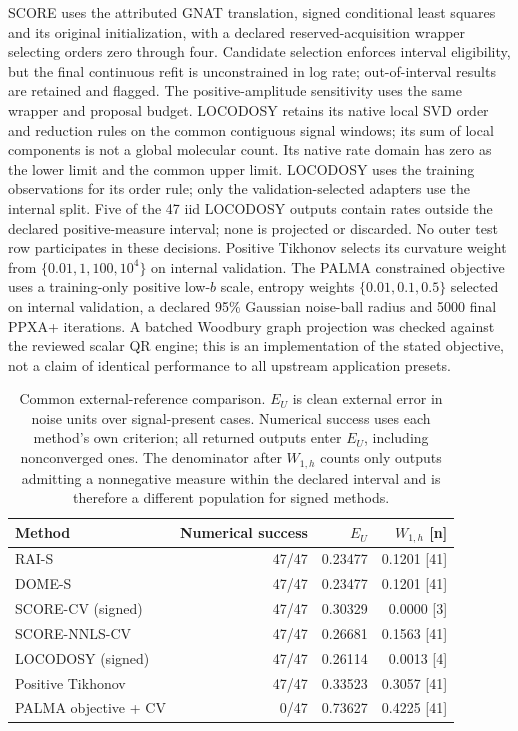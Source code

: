 SCORE uses the attributed GNAT translation, signed conditional least squares
and its original initialization, with a declared reserved-acquisition wrapper
selecting orders zero through four. Candidate selection enforces interval
eligibility, but the final continuous refit is unconstrained in log rate;
out-of-interval results are retained and flagged. The positive-amplitude
sensitivity uses the same wrapper and proposal budget. LOCODOSY retains its native local SVD
order and reduction rules on the common contiguous signal windows; its sum of
local components is not a global molecular count. Its native rate domain has
zero as the lower limit and the common upper limit. LOCODOSY uses the training
observations for its order rule; only the validation-selected adapters use
the internal split. Five of the 47 iid LOCODOSY outputs contain rates outside
the declared positive-measure interval; none is projected or discarded.
No outer test row participates in these decisions. Positive Tikhonov selects
its curvature weight from $\{0.01,1,100,10^4\}$ on internal validation.
The PALMA constrained objective uses a training-only positive low-$b$ scale,
entropy weights $\{0.01,0.1,0.5\}$ selected on internal validation, a declared
95\% Gaussian noise-ball radius and 5000 final PPXA+ iterations. A batched
Woodbury graph projection was checked against the reviewed scalar QR engine;
this is an implementation of the stated objective, not a claim of identical
performance to all upstream application presets.

\begin{table}[htbp]\centering\small
\caption{Common external-reference comparison. $E_U$ is clean external error
in noise units over signal-present cases. Numerical success uses each method's
own criterion; all returned outputs enter $E_U$, including nonconverged ones.
The denominator after $W_{1,h}$ counts only outputs admitting a nonnegative
measure within the declared interval and is therefore a different population
for signed methods.}\label{tab:externalexecuted}
\begin{tabularx}{\linewidth}{@{}Xrrr@{}}\toprule
Method & Numerical success & $E_U$ & $W_{1,h}$ [n]\\\midrule
RAI-S & 47/47 & 0.23477 & 0.1201 [41]\\
DOME-S & 47/47 & 0.23477 & 0.1201 [41]\\
SCORE-CV (signed) & 47/47 & 0.30329 & 0.0000 [3]\\
SCORE-NNLS-CV & 47/47 & 0.26681 & 0.1563 [41]\\
LOCODOSY (signed) & 47/47 & 0.26114 & 0.0013 [4]\\
Positive Tikhonov & 47/47 & 0.33523 & 0.3057 [41]\\
PALMA objective + CV & 0/47 & 0.73627 & 0.4225 [41]\\
\bottomrule\end{tabularx}\end{table}

